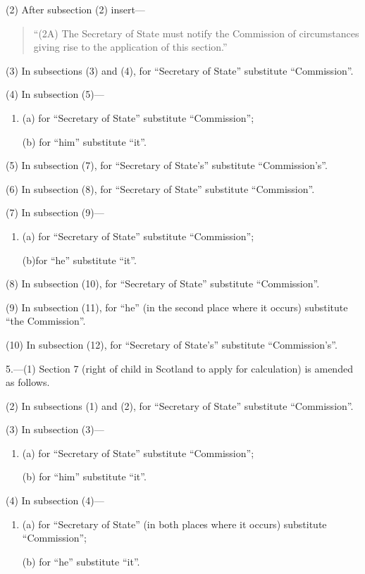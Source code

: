 \documentclass[a4paper]{article}
\begin{document}
(2) After subsection (2) insert—
\begin{quotation}
“(2A) The Secretary of State must notify the Commission of circumstances giving rise to the application of this section.”
\end{quotation}

(3) In subsections (3) and (4), for “Secretary of State” substitute “Commission”.

(4) In subsection (5)—
\begin{enumerate}\item[]
(a) for “Secretary of State” substitute “Commission”;

(b) for “him” substitute “it”.
\end{enumerate}

(5) In subsection (7), for “Secretary of State's” substitute “Commission's”.

(6) In subsection (8), for “Secretary of State” substitute “Commission”.

(7) In subsection (9)—
\begin{enumerate}\item[]
(a) for “Secretary of State” substitute “Commission”;

(b)for “he” substitute “it”.
\end{enumerate}

(8) In subsection (10), for “Secretary of State” substitute “Commission”.

(9) In subsection (11), for “he” (in the second place where it occurs) substitute “the Commission”.

(10) In subsection (12), for “Secretary of State's” substitute “Commission's”.

\medskip

5.---(1) Section 7 (right of child in Scotland to apply for calculation) is amended as follows.

(2) In subsections (1) and (2), for “Secretary of State” substitute “Commission”.

(3) In subsection (3)—
\begin{enumerate}\item[]
(a) for “Secretary of State” substitute “Commission”;

(b) for “him” substitute “it”.
\end{enumerate}

(4) In subsection (4)—
\begin{enumerate}\item[]
(a) for “Secretary of State” (in both places where it occurs) substitute “Commission”;

(b) for “he” substitute “it”.
\end{enumerate}
\end{document}
